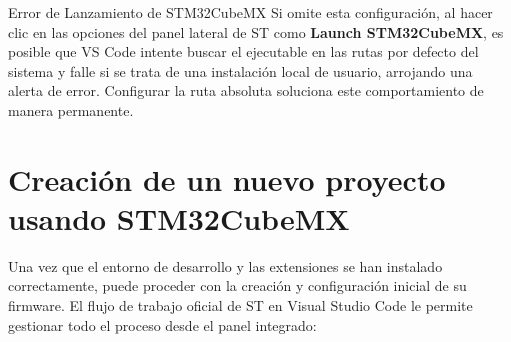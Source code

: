 \documentclass[
10pt, %
a4paper, %
oneside, %
headinclude,footinclude, %
BCOR5mm, %
]{scrartcl}
\begin{document}
\begin{WarningBox}{Error de Lanzamiento de STM32CubeMX}
	Si omite esta configuración, al hacer clic en las opciones del panel lateral de ST como \textbf{Launch STM32CubeMX}, es posible que VS Code intente buscar el ejecutable en las rutas por defecto del sistema y falle si se trata de una instalación local de usuario, arrojando una alerta de error. Configurar la ruta absoluta soluciona este comportamiento de manera permanente.
\end{WarningBox}


\newpage
\newpage
\section{Creación de un nuevo proyecto usando STM32CubeMX}
Una vez que el entorno de desarrollo y las extensiones se han instalado correctamente, puede proceder con la creación y configuración inicial de su firmware. El flujo de trabajo oficial de ST en Visual Studio Code le permite gestionar todo el proceso desde el panel integrado:
\end{document}
